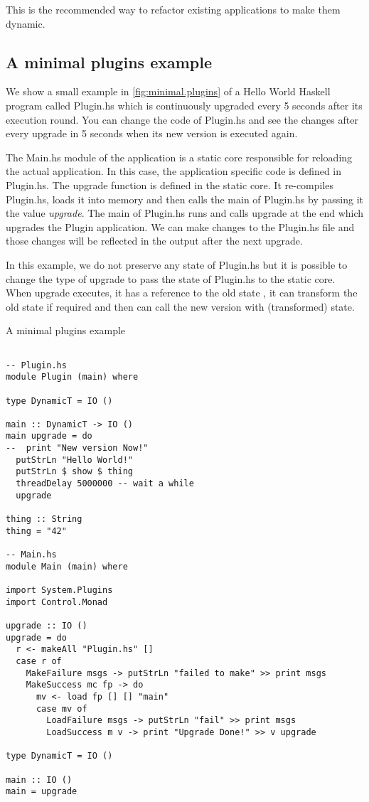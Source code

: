 This is the recommended way to refactor existing applications to make
them dynamic.

\subsection{A minimal plugins example}

We show a small example in \autoref{fig:minimal.plugins} of a Hello
World Haskell program called Plugin.hs which is continuously upgraded
every 5 seconds after its execution round. You can change the code of
Plugin.hs and see the changes after every upgrade in 5 seconds when
its new version is executed again.

The Main.hs module of the application is a static core responsible for
reloading the actual application. In this case, the application
specific code is defined in Plugin.hs. The upgrade function is defined
in the static core. It re-compiles Plugin.hs, loads it into memory and
then calls the main of Plugin.hs by passing it the value
\emph{upgrade}. The main of Plugin.hs runs and calls upgrade at the end
which upgrades the Plugin application. We can make changes to the
Plugin.hs file and those changes will be reflected in the output after
the next upgrade.

In this example, we do not preserve any state of Plugin.hs but it is
possible to change the type of upgrade to pass the state of Plugin.hs to
the static core. When upgrade executes, it has a reference to the old
state , it can transform the old state if required and then can call
the new version with (transformed) state.

\begin{program}
\caption[A minimal plugins example]
{A minimal plugins example}
\label{fig:minimal.plugins}

\begin{verbatim}

-- Plugin.hs
module Plugin (main) where

type DynamicT = IO ()

main :: DynamicT -> IO ()
main upgrade = do
--  print "New version Now!"
  putStrLn "Hello World!"
  putStrLn $ show $ thing
  threadDelay 5000000 -- wait a while
  upgrade

thing :: String
thing = "42"

-- Main.hs
module Main (main) where

import System.Plugins
import Control.Monad

upgrade :: IO ()
upgrade = do
  r <- makeAll "Plugin.hs" []
  case r of
    MakeFailure msgs -> putStrLn "failed to make" >> print msgs
    MakeSuccess mc fp -> do
      mv <- load fp [] [] "main"
      case mv of
        LoadFailure msgs -> putStrLn "fail" >> print msgs
        LoadSuccess m v -> print "Upgrade Done!" >> v upgrade

type DynamicT = IO ()

main :: IO ()
main = upgrade

\end{verbatim}
\end{program}

